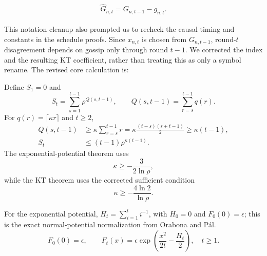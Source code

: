 \documentclass[12pt,english]{reviewresponse}
\newcommand{\br}[1]{\left(#1\right)}
\begin{document}
\begin{revresponse}
\begin{changes}
        \begin{align*}
            \hat{G}_{n,t}=G_{n,t-1}-g_{n,t}.
        \end{align*}
    \end{changes}
    This notation cleanup also prompted us to recheck the causal timing and constants in the schedule proofs.  Since $x_{n,t}$ is chosen from $G_{n,t-1}$, round-$t$ disagreement depends on gossip only through round $t-1$.  We corrected the index and the resulting KT coefficient, rather than treating this as only a symbol rename.  The revised core calculation is:
    \begin{changes}
        Define $S_1=0$ and
        \begin{equation*}
            S_t=\sum_{s=1}^{t-1}\rho^{Q(s,t-1)},\qquad
            Q(s,t-1)=\sum_{r=s}^{t-1}q(r).
        \end{equation*}
        For $q(r)=\lceil\kappa r\rceil$ and $t\geq2$,
        \begin{align*}
            Q(s,t-1)
                & \geq\kappa\sum_{r=s}^{t-1}r
            =\kappa\frac{(t-s)(s+t-1)}{2}
            \geq\kappa(t-1),                   \\
            S_t & \leq(t-1)\rho^{\kappa(t-1)}.
        \end{align*}
        The exponential-potential theorem uses
        \begin{equation*}
            \kappa\geq-\frac{3}{2\ln\rho},
        \end{equation*}
        while the KT theorem uses the corrected sufficient condition
        \begin{equation*}
            \kappa\geq-\frac{4\ln2}{\ln\rho}.
        \end{equation*}

        For the exponential potential, $H_t=\sum_{i=1}^t i^{-1}$, with $H_0=0$ and $F_0(0)=\epsilon$; this is the exact normal-potential normalization from Orabona and P\'al.
        \begin{equation*}
            F_0(0)=\epsilon,\qquad
            F_t(x)=\epsilon\exp\br{\frac{x^2}{2t}-\frac{H_t}{2}},\quad t\geq1.
        \end{equation*}
    \end{changes}
\end{revresponse}
\end{document}
